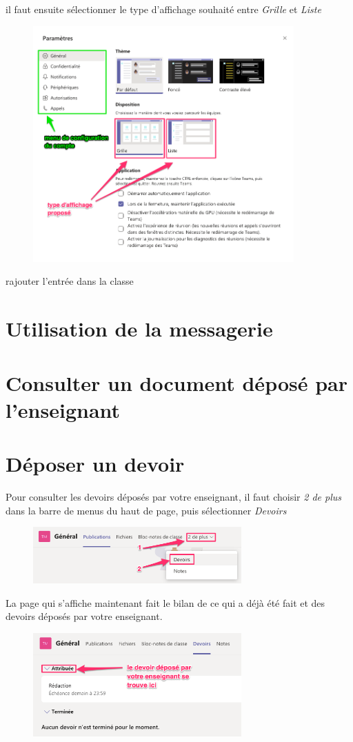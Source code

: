 \documentclass{article}
\begin{document}
il faut ensuite sélectionner le type d'affichage souhaité entre \textit{Grille} et \textit{Liste}

\begin{figure}[h]
\includegraphics[width=10cm]{choix_parametre.png}
\centering
\end{figure}

 rajouter l'entrée dans la classe

\section{Utilisation de la messagerie}

\section{Consulter un document déposé par l'enseignant}

\section{Déposer un devoir}

Pour consulter les devoirs déposés par votre enseignant, il faut choisir \textit{2 de plus} dans la barre de menus du haut de page, puis sélectionner \textit{Devoirs}

\begin{figure}[h]
\includegraphics[width=8cm]{devoir1.png}
\centering
\end{figure}

La page qui s'affiche maintenant fait le bilan de ce qui a déjà été fait et des devoirs déposés par votre enseignant.

\begin{figure}[h]
\includegraphics[width=8cm]{devoir2.png}
\centering
\end{figure}
\end{document}
